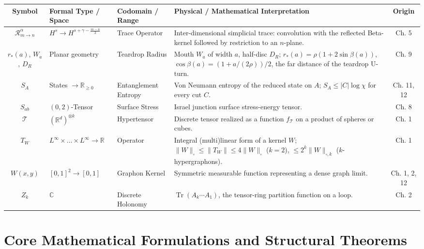 \documentclass[11pt,a4paper,oneside]{article}
\begin{document}
\begin{table}[!htbp]
\centering
\scriptsize
\renewcommand{\arraystretch}{1.2}
\begin{tabularx}{\textwidth}{@{} c p{3.0cm} p{2.6cm} X c @{}}
\toprule
\textbf{Symbol} & \textbf{Formal Type / Space} & \textbf{Codomain / Range} & \textbf{Physical / Mathematical Interpretation} & \textbf{Origin} \\
\midrule
$\mathcal{R}_{m \to n}^\alpha$ & $H^s \to H^{s+\gamma-\frac{m-n}{2}}$ & Trace Operator & Inter-dimensional simplicial trace: convolution with the reflected Beta-kernel followed by restriction to an $n$-plane. & Ch. 5 \\
$r_\ast(a)$, $W_a$, $D_R$ & Planar geometry & Teardrop Radius & Mouth $W_a$ of width $a$, half-disc $D_R$; $r_\ast(a) = \rho(1 + 2\sin\beta(a))$, $\cos\beta(a) = (1 + a/(2\rho))/2$, the far distance of the teardrop U-turn. & Ch. 9 \\
$S_A$ & States $\to \mathbb{R}_{\ge0}$ & Entanglement Entropy & Von Neumann entropy of the reduced state on $A$; $S_A \le |C|\log\chi$ for every cut $C$. & Ch. 11, 12 \\
$S_{ab}$ & $(0,2)$-Tensor & Surface Stress & Israel junction surface stress-energy tensor. & Ch. 8 \\
$\mathcal{T}$ & $(\mathbb{R}^d)^{\otimes k}$ & Hypertensor & Discrete tensor realized as a function $f_{\mathcal{T}}$ on a product of spheres or cubes. & Ch. 1 \\
$T_W$ & $L^\infty \times \dots \times L^\infty \to \mathbb{R}$ & Operator & Integral (multi)linear form of a kernel $W$; $\|W\|_\square \le \|T_W\| \le 4\|W\|_\square$ ($k=2$), $\le 2^k\|W\|_{\square,k}$ ($k$-hypergraphons). & Ch. 1 \\
$W(x, y)$ & $[0,1]^2 \to [0, 1]$ & Graphon Kernel & Symmetric measurable function representing a dense graph limit. & Ch. 1, 2, 12 \\
$Z_k$ & $\mathbb{C}$ & Discrete Holonomy & $\operatorname{Tr}(A_k \cdots A_1)$, the tensor-ring partition function on a loop. & Ch. 2 \\
\bottomrule
\end{tabularx}
\end{table}

\clearpage

\section{Core Mathematical Formulations and Structural Theorems}
\end{document}
